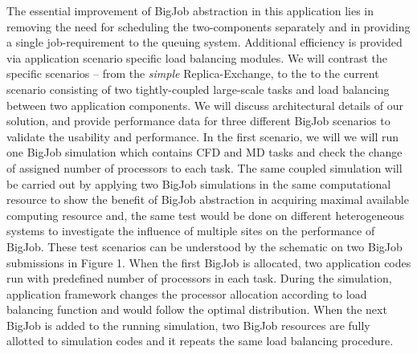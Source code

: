 \documentclass[a4paper]{article}
\begin{document}
The essential improvement of BigJob abstraction in this application lies in removing the need for scheduling the two-components separately and in providing a single job-requirement to the queuing system. Additional efficiency is provided via application scenario specific load balancing modules.  We will contrast the specific scenarios -- from the {\it simple} Replica-Exchange, to the %
to the current scenario consisting of two tightly-coupled large-scale tasks and load balancing between two application components. %
We will discuss architectural details of our solution, and provide performance data for three different BigJob scenarios to validate the usability and performance. In the first scenario, we will we will run one BigJob simulation which contains CFD and MD tasks and check the change of assigned number of processors to each task.  The same coupled simulation will be carried out by applying two BigJob simulations in the same computational resource to show the benefit of BigJob abstraction in acquiring maximal available computing resource and, the same test would be done on different heterogeneous systems to investigate the influence of multiple sites on the performance of BigJob. These test scenarios can be understood by the schematic on two BigJob submissions in Figure 1. When the first BigJob is allocated, two application codes run with predefined number of processors in each task. During the simulation, application framework changes the processor allocation according to load balancing function and would follow the optimal distribution. When the next BigJob is added to the running simulation, two BigJob resources are fully allotted to simulation codes and it repeats the same load balancing procedure.

\vspace{12pt}
\end{document}
